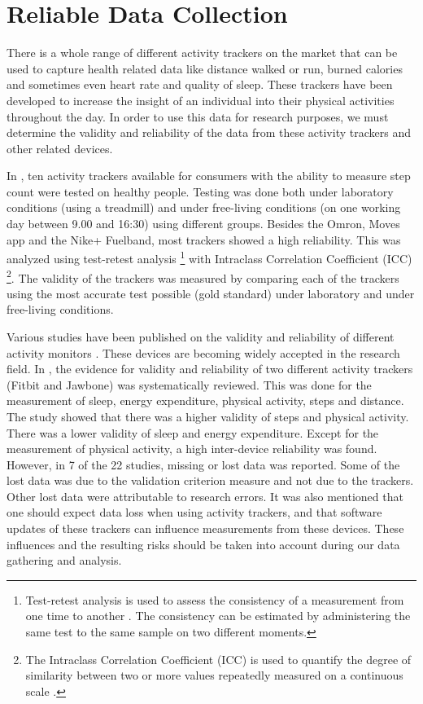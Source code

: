 
\section{Reliable Data Collection} \label{section: Reliable Data Collection}
There is a whole range of different activity trackers on the market that can be used to capture health related data like distance walked or run, burned calories and sometimes even heart rate and quality of sleep. 
These trackers have been developed to increase the insight of an individual into their physical activities throughout the day. 
In order to use this data for research purposes, we must determine the validity and reliability of the data from these activity trackers and other related devices.

In \cite{kooiman2015reliability}, ten activity trackers available for consumers with the ability to measure step count were tested on healthy people.
Testing was done both under laboratory conditions (using a treadmill) and under free-living conditions (on one working day between 9.00 and 16:30) using different groups. 
Besides the Omron, Moves app and the Nike+ Fuelband, most trackers showed a high reliability. 
This was analyzed using test-retest analysis%
\footnote{Test-retest analysis is used to assess the consistency of a measurement from one time to another \cite{trochim2006types}. 
The consistency can be estimated by administering the same test to the same sample on two different moments.} with Intraclass Correlation Coefficient (ICC)%
\footnote{The Intraclass Correlation Coefficient (ICC) is used to quantify the degree of similarity between two or more values repeatedly measured on a continuous scale \cite{koch1982intraclass}.}.
The validity of the trackers was measured by comparing each of the trackers using the most accurate test possible (gold standard) under laboratory and under free-living conditions.

Various studies have been published on the validity and reliability of different activity monitors \cite{bassett2012calibration, chen2012re, butte2012assessing, freedson2012assessment}. These devices are becoming widely accepted in the research field.
In \cite{evenson2015systematic}, the evidence for validity and reliability of two different activity trackers (Fitbit and Jawbone) was systematically reviewed.
This was done for the measurement of sleep, energy expenditure, physical activity, steps and distance.
The study showed that there was a higher validity of steps and physical activity.
There was a lower validity of sleep and energy expenditure. 
Except for the measurement of physical activity, a high inter-device reliability was found.
However, in 7 of the 22 studies, missing or lost data was reported.
Some of the lost data was due to the validation criterion measure and not due to the trackers. 
Other lost data were attributable to research errors.
It was also mentioned that one should expect data loss when using activity trackers, and that software updates of these trackers can influence measurements from these devices.
These influences and the resulting risks should be taken into account during our data gathering and analysis.

